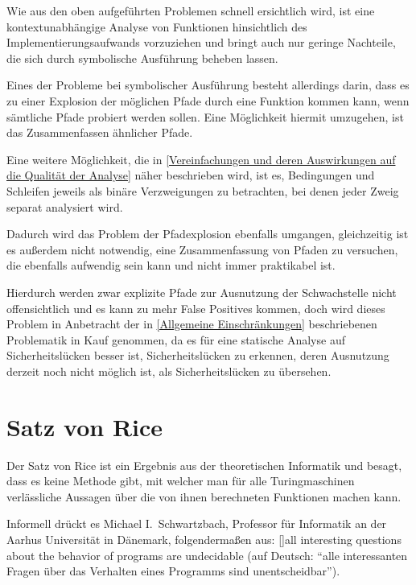         Wie aus den oben aufgeführten Problemen schnell ersichtlich wird,
        ist eine kontextunabhängige Analyse von Funktionen hinsichtlich des Implementierungsaufwands vorzuziehen und
        bringt auch nur geringe Nachteile,
        die sich durch symbolische Ausführung beheben lassen.

        Eines der Probleme bei symbolischer Ausführung besteht allerdings darin,
        dass es zu einer Explosion der möglichen Pfade durch eine Funktion kommen kann,
        wenn sämtliche Pfade probiert werden sollen.
        Eine Möglichkeit hiermit umzugehen,
        ist das Zusammenfassen ähnlicher Pfade.\cite{Kuznetsov2012}

        Eine weitere Möglichkeit,
        die in
        \vref{Vereinfachungen und deren Auswirkungen auf die Qualität der Analyse} näher beschrieben wird,
        ist es,
        Bedingungen und
        Schleifen jeweils als binäre Verzweigungen zu betrachten,
        bei denen jeder Zweig separat analysiert wird.

        Dadurch wird das Problem der Pfadexplosion ebenfalls umgangen,
        gleichzeitig ist es außerdem nicht notwendig,
        eine Zusammenfassung von Pfaden zu versuchen,
        die ebenfalls aufwendig sein kann und
        nicht immer praktikabel ist.

        Hierdurch werden zwar explizite Pfade zur Ausnutzung der Schwachstelle nicht offensichtlich und
        es kann zu mehr False Positives kommen,
        doch wird dieses Problem in Anbetracht der in
        \vref{Allgemeine Einschränkungen} beschriebenen Problematik in Kauf genommen,
        da es für eine statische Analyse auf Sicherheitslücken besser ist,
        Sicherheitslücken zu erkennen,
        deren Ausnutzung derzeit noch nicht möglich ist,
        als Sicherheitslücken zu übersehen.

    \section{Satz von Rice}\label{Satz von Rice}
        Der Satz von Rice ist ein Ergebnis aus der theoretischen Informatik und
        besagt,
        dass es keine Methode gibt,
        mit welcher man für alle Turingmaschinen verlässliche Aussagen über die von ihnen berechneten Funktionen machen kann.\cite[181]{Kuske2011}

        Informell drückt es Michael I.\ Schwartzbach,
        Professor für Informatik an der Aarhus Universität in Dänemark,
        folgendermaßen aus:
        [{\cite[3]{Schwartzbach2007}}]{all interesting questions about the behavior of programs are undecidable}
        (auf Deutsch:
        \enquote{alle interessanten Fragen über das Verhalten eines Programms sind unentscheidbar}).

